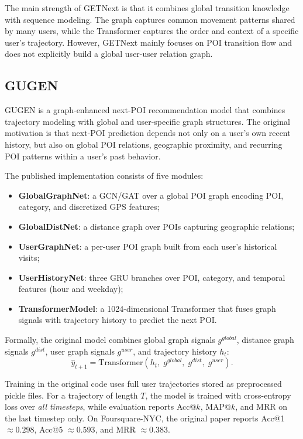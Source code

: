 \documentclass[12pt, journal]{IEEEtran}
\begin{document}
The main strength of GETNext is that it combines global transition knowledge with sequence modeling. The graph captures common movement patterns shared by many users, while the Transformer captures the order and context of a specific user's trajectory. However, GETNext mainly focuses on POI transition flow and does not explicitly build a global user-user relation graph.

\subsection{GUGEN}

GUGEN \cite{zuo2024gugen} is a graph-enhanced next-POI recommendation model that combines trajectory modeling with global and user-specific graph structures. The original motivation is that next-POI prediction depends not only on a user's own recent history, but also on global POI relations, geographic proximity, and recurring POI patterns within a user's past behavior.

The published implementation consists of five modules:
\begin{itemize}
    \item \textbf{GlobalGraphNet}: a GCN/GAT over a global POI graph encoding POI, category, and discretized GPS features;
    \item \textbf{GlobalDistNet}: a distance graph over POIs capturing geographic relations;
    \item \textbf{UserGraphNet}: a per-user POI graph built from each user's historical visits;
    \item \textbf{UserHistoryNet}: three GRU branches over POI, category, and temporal features (hour and weekday);
    \item \textbf{TransformerModel}: a 1024-dimensional Transformer that fuses graph signals with trajectory history to predict the next POI.
\end{itemize}

Formally, the original model combines global graph signals $g^{global}$, distance graph signals $g^{dist}$, user graph signals $g^{user}$, and trajectory history $h_t$:
\begin{equation}
    \hat{y}_{t+1} =
    \mathrm{Transformer}\!\left(
    h_t,\; g^{global},\; g^{dist},\; g^{user}
    \right).
\end{equation}

Training in the original code uses full user trajectories stored as preprocessed pickle files. For a trajectory of length $T$, the model is trained with cross-entropy loss over \emph{all timesteps}, while evaluation reports Acc@$k$, MAP@$k$, and MRR on the last timestep only. On Foursquare-NYC, the original paper reports Acc@1 $\approx 0.298$, Acc@5 $\approx 0.593$, and MRR $\approx 0.383$.
\end{document}
